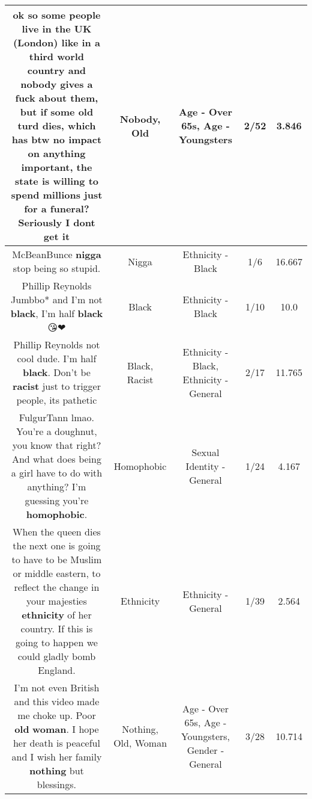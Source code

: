 \documentclass[11pt]{article}
\newlength\mylength
\begin{document}
\begin{center}
\begin{longtable}{|C{.65\mylength}|C{.30\mylength}|C{.12\mylength}|C{.12\mylength}|C{.12\mylength}|}
  \small ok so some people live in the UK (London) like in a third world country and \textbf{nobody} gives a fuck about them, but if some \textbf{old} turd dies, which has btw no impact on anything important, the state is willing to spend millions just for a funeral? Seriously I dont get it\normalsize   & Nobody, Old & Age - Over 65s, Age - Youngsters & 2/52 & 3.846 \\  \hline
  \small McBeanBunce \textbf{nigga} stop being so stupid.\normalsize   & Nigga & Ethnicity - Black & 1/6 & 16.667 \\  \hline
  \small Phillip Reynolds Jumbbo* and I'm not \textbf{black}, I'm half \textbf{black}😘❤\normalsize   & Black & Ethnicity - Black & 1/10 & 10.0 \\  \hline
  \small Phillip Reynolds not cool dude. I'm half \textbf{black}. Don't be \textbf{racist} just to trigger people, its pathetic\normalsize   & Black, Racist & Ethnicity - Black, Ethnicity - General & 2/17 & 11.765 \\  \hline
  \small FulgurTann lmao. You're  a doughnut, you know that right? And what does being a girl have to do with anything?  I'm guessing you're \textbf{homophobic}.\normalsize   & Homophobic & Sexual Identity - General & 1/24 & 4.167 \\  \hline
  \small When the queen dies the next one is going to have to be Muslim or middle eastern, to reflect the change in your majesties \textbf{ethnicity} of her country. If this is going to happen we could gladly bomb England.\normalsize   & Ethnicity & Ethnicity - General & 1/39 & 2.564 \\  \hline
  \small I'm not even British and this video made me choke up. Poor \textbf{old} \textbf{woman}. I hope her death is peaceful and I wish her family \textbf{nothing} but blessings.\normalsize   & Nothing, Old, Woman & Age - Over 65s, Age - Youngsters, Gender - General & 3/28 & 10.714 \\  \hline

\end{longtable}
\end{center}
\end{document}
